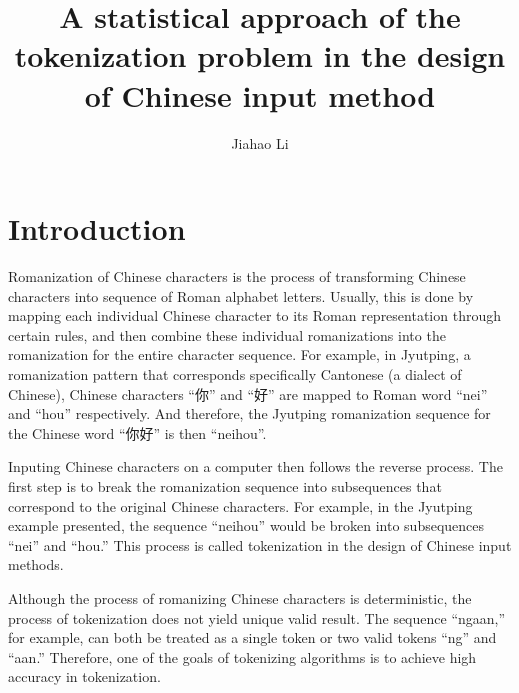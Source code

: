 \documentclass[a4paper,11pt,twocolumn]{article}
\title{A statistical approach of the tokenization problem in the design of Chinese input method}
\date{\vspace{-5ex}}
\author{Jiahao Li}
\begin{document}



\section{Introduction}

Romanization of Chinese characters is the process of transforming Chinese characters into sequence of Roman alphabet letters. Usually, this is done by mapping each individual Chinese character to its Roman representation through certain rules, and then combine these individual romanizations into the romanization for the entire character sequence. For example, in Jyutping, a romanization pattern that corresponds specifically Cantonese (a dialect of Chinese), Chinese characters ``{\song 你}'' and ``{\song 好}'' are mapped to Roman word ``nei'' and ``hou'' respectively. And therefore, the Jyutping romanization sequence for the Chinese word ``{\song 你好}'' is then ``neihou''.

Inputing Chinese characters on a computer then follows the reverse process. The first step is to break the romanization sequence into subsequences that correspond to the original Chinese characters. For example, in the Jyutping example presented, the sequence ``neihou'' would be broken into subsequences ``nei'' and ``hou.'' This process is called tokenization in the design of Chinese input methods.

Although the process of romanizing Chinese characters is deterministic, the process of tokenization does not yield unique valid result. The sequence ``ngaan,'' for example, can both be treated as a single token or two valid tokens ``ng'' and ``aan.'' Therefore, one of the goals of tokenizing algorithms is to achieve high accuracy in tokenization.
\end{document}
